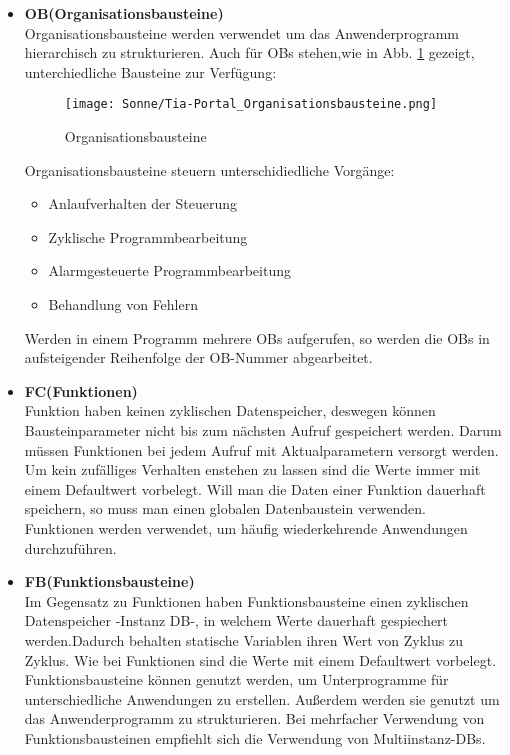    \begin{itemize}
        \item[1.] \textbf{OB(Organisationsbausteine)} \\
            Organisationsbausteine werden verwendet um das Anwenderprogramm hierarchisch zu strukturieren. Auch für OBs stehen,wie in Abb. \ref{Organisationsbausteine} gezeigt, unterchiedliche Bausteine zur Verfügung:
            \begin{figure}[h]
                \texttt{[image: Sonne/Tia-Portal\_Organisationsbausteine.png]}
                \caption{Organisationsbausteine \cite{Programmierleitfaden_für_S7-1500}}
                \label{Organisationsbausteine}
            \end{figure}

            Organisationsbausteine steuern unterschidiedliche Vorgänge:
            \begin{itemize}
                \item Anlaufverhalten der Steuerung
                \item Zyklische Programmbearbeitung
                \item Alarmgesteuerte Programmbearbeitung
                \item Behandlung von Fehlern
            \end{itemize}
            Werden in einem Programm mehrere OBs aufgerufen, so werden die OBs in aufsteigender Reihenfolge der OB-Nummer abgearbeitet. 
            \cite{Programmierleitfaden_für_S7-1500}

        \item[2.] \textbf{FC(Funktionen)} \\
            Funktion haben keinen zyklischen Datenspeicher, deswegen können Bausteinparameter nicht bis zum nächsten Aufruf gespeichert werden. Darum müssen Funktionen bei jedem Aufruf mit Aktualparametern versorgt werden. Um kein zufälliges Verhalten enstehen zu lassen sind die Werte immer mit einem Defaultwert vorbelegt. Will man die Daten einer Funktion dauerhaft speichern, so muss man einen globalen Datenbaustein verwenden.\\
            Funktionen werden verwendet, um häufig wiederkehrende Anwendungen durchzuführen.
            \cite{Programmierleitfaden_für_S7-1500}
            
        \item[3.] \textbf{FB(Funktionsbausteine)} \\
            Im Gegensatz zu Funktionen haben Funktionsbausteine einen zyklischen Datenspeicher -Instanz DB-, in welchem Werte dauerhaft gespiechert werden.Dadurch behalten statische Variablen ihren Wert von Zyklus zu Zyklus. Wie bei Funktionen sind die Werte mit einem Defaultwert vorbelegt.\\
            Funktionsbausteine können genutzt werden, um Unterprogramme für unterschiedliche Anwendungen zu erstellen. Außerdem werden sie genutzt um das Anwenderprogramm zu strukturieren. Bei mehrfacher Verwendung von Funktionsbausteinen empfiehlt sich die Verwendung von Multiinstanz-DBs.
            \cite{Programmierleitfaden_für_S7-1500}
        

\end{itemize}

